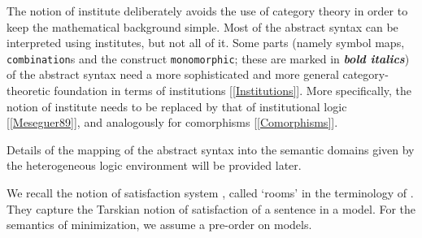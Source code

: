 \documentclass[%
\ifpretendfinal
final%
\else
draft%
\fi,
a4paper,
wd]{isov2}
\newcommand*{\institutionsOnly}{\bfseries\itshape}
\newcommand*{\syntax}[1]{\texttt{#1}}
\begin{document}
The notion of institute deliberately avoids the use of category theory
in order to keep the mathematical background simple.  Most of the
abstract syntax can be interpreted using institutes, but not all of
it. Some parts (namely symbol maps, \syntax{combination}s
 and the construct \syntax{monomorphic};
these are marked in {\institutionsOnly bold italics}) of the abstract
syntax need a more sophisticated and more general category-theoretic
foundation in terms of institutions [\ref{Institutions}]. More
specifically, the notion of institute needs to be replaced by that of
institutional logic [\ref{Meseguer89}], and analogously for
comorphisms [\ref{Comorphisms}].

Details of the mapping of the abstract syntax into the semantic
domains given by the heterogeneous logic environment will be provided later.







We recall the notion of satisfaction system
, called `rooms' in the terminology of
. They capture the Tarskian notion of satisfaction of a
sentence in a model. For the semantics of minimization,
we assume a pre-order on models.
\end{document}
